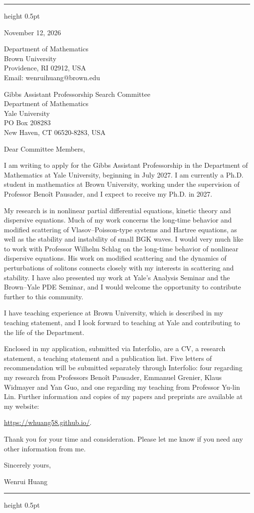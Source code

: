 \documentclass[10pt]{article}
\begin{document}
\vspace{0.08in}
\hrule height 0.5pt

\vspace{0.47in}
\hfill
\begin{minipage}{2.27in}
November 12, 2026

\vspace{0.16in}
Department of Mathematics\\
Brown University\\
Providence, RI 02912, USA\\
Email: wenrui\textunderscore huang@brown.edu
\end{minipage}

\vspace{0.30in}
Gibbs Assistant Professorship Search Committee\\
Department of Mathematics\\
Yale University\\
PO Box 208283\\
New Haven, CT 06520-8283, USA

\vspace{0.16in}
Dear Committee Members,

I am writing to apply for the Gibbs Assistant Professorship in the Department of Mathematics at Yale University, beginning in July 2027. I am currently a Ph.D. student in mathematics at Brown University, working under the supervision of Professor Beno\^{i}t Pausader, and I expect to receive my Ph.D. in 2027.

My research is in nonlinear partial differential equations, kinetic theory and dispersive equations. Much of my work concerns the long-time behavior and modified scattering of Vlasov--Poisson-type systems and Hartree equations, as well as the stability and instability of small BGK waves. I would very much like to work with Professor Wilhelm Schlag on the long-time behavior of nonlinear dispersive equations. His work on modified scattering and the dynamics of perturbations of solitons connects closely with my interests in scattering and stability. I have also presented my work at Yale's Analysis Seminar and the Brown--Yale PDE Seminar, and I would welcome the opportunity to contribute further to this community.

I have teaching experience at Brown University, which is described in my teaching statement, and I look forward to teaching at Yale and contributing to the life of the Department.

Enclosed in my application, submitted via Interfolio, are a CV, a research statement, a teaching statement and a publication list. Five letters of recommendation will be submitted separately through Interfolio: four regarding my research from Professors Beno\^{i}t Pausader, Emmanuel Grenier, Klaus Widmayer and Yan Guo, and one regarding my teaching from Professor Yu-lin Lin. Further information and copies of my papers and preprints are available at my website:

\url{https://whuang58.github.io/}.

\medskip
Thank you for your time and consideration. Please let me know if you need any other information from me.

\vspace{0.12in}
Sincerely yours,

\vspace{0.12in}
Wenrui Huang

\vfill
\hrule height 0.5pt
\end{document}
